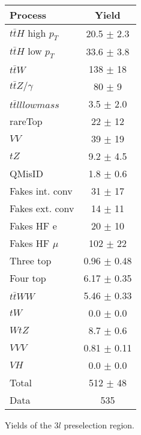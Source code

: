 \begin{center}
\begin{tabular}{|l|c|}
\hline 
Process & {Yield}\\
\hline 
  $t\bar{t}H$ high $p_T$   & 20.5 $\pm$ 2.3 \\ 
  $t\bar{t}H$ low $p_T$   & 33.6 $\pm$ 3.8 \\ 
  $t\bar{t}W$   & 138 $\pm$ 18 \\ 
  $t\bar{t}Z/\gamma$   & 80 $\pm$ 9 \\ 
  $t\bar{t}ll low mass$   & 3.5 $\pm$ 2.0 \\ 
  rareTop   & 22 $\pm$ 12 \\ 
  $VV$   & 39 $\pm$ 19 \\ 
  $tZ$   & 9.2 $\pm$ 4.5 \\ 
  QMisID   & 1.8 $\pm$ 0.6 \\ 
  Fakes int. conv & 31 $\pm$ 17 \\
  Fakes ext. conv & 14 $\pm$ 11 \\
  Fakes HF e & 20 $\pm$  10 \\
  Fakes HF $\mu$ & 102 $\pm$ 22 \\  
  Three top   & 0.96 $\pm$ 0.48 \\ 
  Four top   & 6.17 $\pm$ 0.35 \\ 
  $t\bar{t}WW$   & 5.46 $\pm$ 0.33 \\ 
  $tW$   & 0.0 $\pm$ 0.0 \\ 
  $WtZ$   & 8.7 $\pm$ 0.6 \\ 
  $VVV$   & 0.81 $\pm$ 0.11 \\ 
  $VH$   & 0.0 $\pm$ 0.0 \\ 
\hline 
  Total  & 512 $\pm$ 48 \\ 
\hline 
  Data   & 535 \\ 
\hline 
\end{tabular} 
\label{tab:Yields3l}
\caption{Yields of the $3l$ preselection region.} 
\end{center} 

